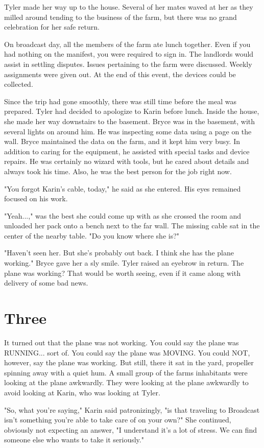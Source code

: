 \documentclass[courier]{sffms}
\begin{document}
Tyler made her way up to the house. Several of her mates waved
at her as they milled around tending to the business of the
farm, but there was no grand celebration for her safe return.

On broadcast day, all the members of the farm ate lunch
together. Even if you had nothing on the manifest, you were
required to sign in. The landlords would assist in settling
disputes. Issues pertaining to the farm were discussed. Weekly
assignments were given out. At the end of this event, the
devices could be collected.

Since the trip had gone smoothly, there was still time before
the meal was prepared. Tyler had decided to apologize to Karin
before lunch. Inside the house, she made her way downstairs to
the basement. Bryce was in the basement, with several lights on
around him. He was inspecting some data using a page on the
wall. Bryce maintained the data on the farm, and it kept him
very busy. In addition to caring for the equipment, he assisted
with special tasks and device repairs. He was certainly no
wizard with tools, but he cared about details and always took
his time. Also, he was the best person for the job right now.

"You forgot Karin's cable, today," he said as she entered. His
eyes remained focused on his work.

"Yeah...," was the best she could come up with as she crossed
the room and unloaded her pack onto a bench next to the far
wall. The missing cable sat in the center of the nearby table.
"Do you know where she is?"

"Haven't seen her. But she's probably out back. I think she has
the plane working." Bryce gave her a sly smile. Tyler raised an
eyebrow in return. The plane was working? That would be worth
seeing, even if it came along with delivery of some bad news.

\chapter{Three}
It turned out that the plane was not working. You could say the
plane was RUNNING... sort of. You could say the plane was
MOVING. You could NOT, however, say the plane was working. But
still, there it sat in the yard, propeller spinning away with a
quiet hum. A small group of the farms inhabitants were looking
at the plane awkwardly. They were looking at the plane awkwardly
to avoid looking at Karin, who was looking at Tyler.

"So, what you're saying," Karin said patronizingly, "is that traveling to Broadcast isn't
something you're able to take care of on your own?" She continued, obviously
not expecting an answer, "I understand it's a lot of stress. We can find
someone else who wants to take it seriously."
\end{document}
